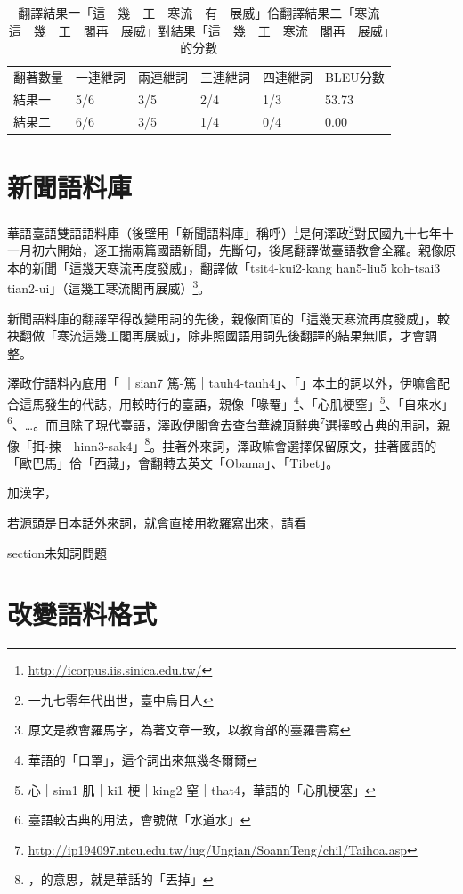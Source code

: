 \documentclass[final,oneside,onecolumn,12pt,a4paper]{book}%
\begin{document}
\begin{table}
\caption{翻譯結果一「這　幾　工　寒流　有　展威」佮翻譯結果二「寒流　這　幾　工　閣再　展威」對結果「這　幾　工　寒流　閣再　展威」的分數}%
\label{表：範例BLEU分數}
\begin{tabular}{llllll}
翻著數量 & 一連紲詞 & 兩連紲詞 & 三連紲詞 & 四連紲詞 & BLEU分數\\
結果一 & 5/6 & 3/5 & 2/4 & 1/3 & 53.73\\
結果二 & 6/6 & 3/5 & 1/4 & 0/4 & 0.00
\end{tabular}
\end{table}

\section{新聞語料庫}
\label{節：新聞語料庫}
華語臺語雙語語料庫（後壁用「新聞語料庫」稱呼）\footnote{\url{http://icorpus.iis.sinica.edu.tw/}}是何澤政\footnote{一九七零年代出世，臺中烏日人}對民國九十七年十一月初六開始，逐工揣兩篇國語新聞，先斷句，後尾翻譯做臺語教會全羅。親像原本的新聞「這幾天寒流再度發威」，翻譯做「tsit4-kui2-kang han5-liu5 koh-tsai3 tian2-ui」（這幾工寒流閣再展威）\footnote{原文是教會羅馬字，為著文章一致，以教育部的臺羅書寫}。

新聞語料庫的翻譯罕得改變用詞的先後，親像面頂的「這幾天寒流再度發威」，較袂翻做「寒流這幾工閣再展威」，除非照國語用詞先後翻譯的結果無順，才會調整。

澤政佇語料內底用「𤺪｜sian7 篤-篤｜tauh4-tauh4」、「」本土的詞以外，伊嘛會配合這馬發生的代誌，用較時行的臺語，親像「喙罨」\footnote{華語的「口罩」，這个詞出來無幾冬爾爾}、「心肌梗窒」\footnote{心｜sim1 肌｜ki1 梗｜king2 窒｜that4，華語的「心肌梗塞」}、「自來水」\footnote{臺語較古典的用法，會號做「水道水」}、…。而且除了現代臺語，澤政伊閣會去查台華線頂辭典\footnote{\url{http://ip194097.ntcu.edu.tw/iug/Ungian/SoannTeng/chil/Taihoa.asp}}選擇較古典的用詞，親像「挕-捒　hinn3-sak4」\footnote{，的意思，就是華話的「丟掉」}。拄著外來詞，澤政嘛會選擇保留原文，拄著國語的「歐巴馬」佮「西藏」，會翻轉去英文「Obama」、「Tibet」。

加漢字，

若源頭是日本話外來詞，就會直接用教羅寫出來，請看

section{未知詞問題}
\label{節：未知詞問題}

\section{改變語料格式}
\label{節：改變語料格式}
\end{document}

